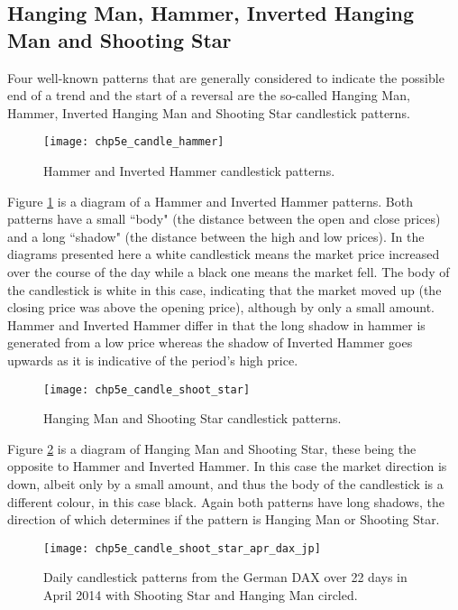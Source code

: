 \subsection{Hanging Man, Hammer, Inverted Hanging Man and Shooting Star}
Four well-known patterns that are generally considered to indicate the possible end of a trend and the start of a reversal are the so-called Hanging Man, Hammer, Inverted Hanging Man and Shooting Star candlestick patterns. 

\begin{figure}[tbph]
\centering
\texttt{[image: chp5e\_candle\_hammer]}
\caption[Hammer and Inverted Hammer candlestick patterns]{Hammer and Inverted Hammer candlestick patterns.}
\label{fig:chp5e:hammer}
\end{figure}

Figure \ref{fig:chp5e:hammer} is a diagram of a Hammer and Inverted Hammer patterns. Both patterns have a small \textquotedblleft body" (the distance between the open and close prices) and a long \textquotedblleft shadow" (the distance between the high and low prices). In the diagrams presented here a white candlestick means the market price increased over the course of the day while a black one means the market fell. The body of the candlestick is white in this case, indicating that the market moved up (the closing price was above the opening price), although by only a small amount. Hammer and Inverted Hammer differ in that the long shadow in hammer is generated from a low price whereas the shadow of Inverted Hammer goes upwards as it is indicative of the period's high price.

\begin{figure}[tbph]
\centering
\texttt{[image: chp5e\_candle\_shoot\_star]}
\caption[Hanging Man and Shooting Star candlestick patterns]{Hanging Man and Shooting Star candlestick patterns.}
\label{fig:chp5e:shoot_star}
\end{figure}

Figure \ref{fig:chp5e:shoot_star} is a diagram of Hanging Man and Shooting Star, these being the opposite to Hammer and Inverted Hammer. In this case the market direction is down, albeit only by a small amount, and thus the body of the candlestick is a different colour, in this case black. Again both patterns have long shadows, the direction of which determines if the pattern is Hanging Man or Shooting Star.

\begin{figure}[tbph]
\centering
\texttt{[image: chp5e\_candle\_shoot\_star\_apr\_dax\_jp]}
\caption [DAX candlestick patterns occurring in April 2014.]{Daily candlestick patterns from the German DAX over 22 days in April 2014 with Shooting Star and Hanging Man circled.}
\label{fig:chp5e:shoot_star_dax}
\end{figure}

